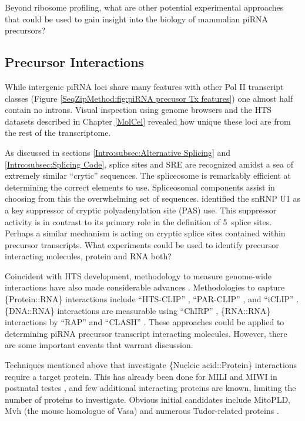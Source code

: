     Beyond ribosome profiling, what are other potential experimental approaches that could be used to gain insight into the biology of mammalian piRNA precursors?

  \subsection{Precursor Interactions}
    \label{Disc:subsec:Labeling of precursors}

    While intergenic piRNA loci share many features with other Pol II transcript classes (Figure \ref{SeqZipMethod:fig:piRNA precusor Tx features}) one almost half contain no introns. Visual inspection using genome browsers and the HTS datasets described in Chapter \ref{MolCel} revealed how unique these loci are from the rest of the transcriptome.

    As discussed in sections \ref{Intro:subsec:Alternative Splicing} and \ref{Intro:subsec:Splicing Code}, splice sites and SRE are recognized amidst a sea of extremely similar ``crytic'' sequences. The spliceosome is remarkably efficient at determining the correct elements to use. Spliceosomal components assist in choosing from this the overwhelming set of sequences. \citet{Berg2012} identified the snRNP U1 as a key suppressor of cryptic polyadenylation site (PAS) use. This suppressor activity is in contrast to its primary role in the definition of 5\textprime~splice sites. Perhaps a similar mechanism is acting on cryptic splice sites contained within precursor transcripts. What experiments could be used to identify precursor interacting molecules, protein and RNA both?

    Coincident with HTS development, methodology to measure genome-wide interactions have also made considerable advances \citep{Konig2011}. Methodologies to capture \{Protein::RNA\} interactions include ``HTS-CLIP'' \citep{Licatalosi2008}, ``PAR-CLIP'' \citep{Hafner2010}, and ``iCLIP'' \citep{Konig2010}. \{DNA::RNA\} interactions are measurable using ``ChIRP'' \citep{Chu2012}, \{RNA::RNA\} interactions by ``RAP'' and ``CLASH'' \citep{Engreitz2013,Helwak2014}. These approaches could be applied to determining piRNA precursor transcript interacting molecules. However, there are some important caveats that warrant discussion.

    Techniques mentioned above that investigate \{Nucleic acid::Protein\} interactions require a target protein. This has already been done for MILI and MIWI in postnatal testes \citep{Vourekas2012}, and few additional interacting proteins are known, limiting the number of proteins to investigate. Obvious initial candidates include MitoPLD, Mvh \citep{Lasko2013} (the mouse homologue of Vasa) and numerous Tudor-related proteins \citep{Chen2011}.

